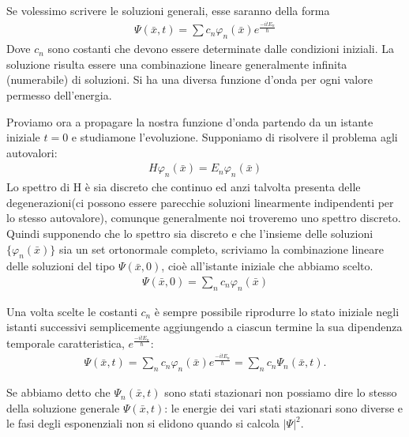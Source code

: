Se volessimo scrivere le soluzioni generali, esse saranno della forma 
\begin{equation}\begin{split}
\Psi\left(\bar x,t\right)=\sum c_n \varphi_n \left(\bar x\right)e^{\frac{-itE_n}{\hbar}}
\end{split}\end{equation}
Dove $c_n$ sono costanti che devono essere determinate dalle condizioni iniziali.
La soluzione risulta essere una combinazione lineare generalmente infinita (numerabile) di soluzioni.
Si ha una diversa funzione d'onda per ogni valore permesso dell'energia.

Proviamo ora a propagare la nostra funzione d'onda partendo da un istante iniziale $t=0$ e studiamone l'evoluzione. Supponiamo di risolvere il problema agli autovalori:
\begin{equation}\begin{split}
H\varphi_n \left(\bar x\right)=E_n\varphi_n \left(\bar x\right)
\end{split}\end{equation}
Lo spettro di H è sia discreto che continuo ed anzi talvolta presenta delle degenerazioni(ci possono essere parecchie soluzioni linearmente indipendenti per lo stesso autovalore), comunque generalmente noi troveremo uno spettro discreto. Quindi supponendo che lo spettro sia discreto e che l'insieme delle soluzioni $\{\varphi_n \left(\bar x\right)\}$ sia un set ortonormale completo, scriviamo la combinazione lineare delle soluzioni del tipo $\Psi\left(\bar x,0\right)$, cioè all'istante iniziale che abbiamo scelto.
\begin{equation}\begin{split}
\Psi\left(\bar x,0\right)=\sum_n c_n \varphi_n \left(\bar x\right)
\end{split}\end{equation}

Una volta scelte le costanti $c_n$ è sempre possibile riprodurre lo stato iniziale negli istanti successivi semplicemente aggiungendo a ciascun termine la sua dipendenza temporale caratteristica, $e^{\frac{-itE_n}{\hbar}}$:
\begin{equation}\begin{split}
\Psi\left(\bar x,t\right)=\sum_n c_n \varphi_n \left(\bar x\right)e^{\frac{-itE_n}{\hbar}}=\sum_n c_n \Psi_n \left(\bar x,t\right).
\end{split}\end{equation}

Se abbiamo detto che $\Psi_n \left(\bar x,t\right)$ sono stati stazionari non possiamo dire lo stesso della soluzione generale $\Psi\left(\bar x,t\right)$: le energie dei vari stati stazionari sono diverse e le fasi degli esponenziali non si elidono quando si calcola $|\Psi|^2$.


